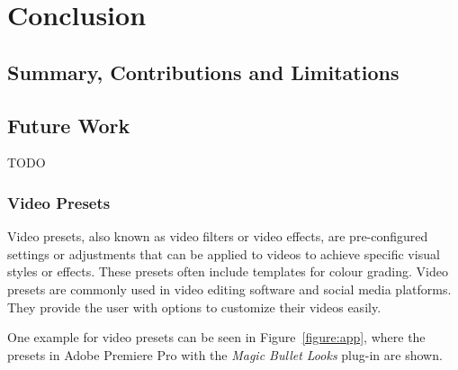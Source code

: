 \documentclass[../MasterThesis.tex]{subfiles}
\begin{document}
	
	
%
%
%
%
%
%
%
%
\newpage
\section{Conclusion} \label{section:conclusion}


\subsection{Summary, Contributions and Limitations} \label{subsection:summary}




\subsection{Future Work} \label{subsection:futurework}


TODO


\subsubsection*{Video Presets}

Video presets, also known as video filters or video effects, are pre-configured settings or adjustments that can be applied to videos to achieve specific visual styles or effects. 
These presets often include templates for colour grading. 
Video presets are commonly used in video editing software and social media platforms. They provide the user with options to customize their videos easily. 

One example for video presets can be seen in Figure~\ref{figure:app}, where the presets in Adobe Premiere Pro with the \textit{Magic Bullet Looks} plug-in are shown.~\cite{premierepro, magicbullet}
\end{document}
